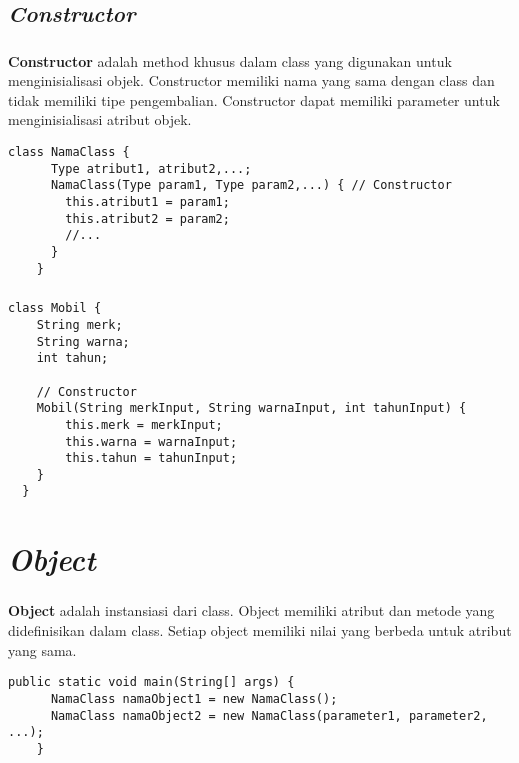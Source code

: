 \documentclass{../praktikum-ppt}
\begin{document}
  \subsection{\textit{Constructor}}
  \begin{frame}[fragile]
    \frametitle{\insertsection}
    \framesubtitle{\insertsubsection}
    \begin{definisi}
      \textbf{Constructor} adalah method khusus dalam class yang digunakan untuk menginisialisasi objek. Constructor memiliki nama yang sama dengan class dan tidak memiliki tipe pengembalian. Constructor dapat memiliki parameter untuk menginisialisasi atribut objek.
    \end{definisi}
    \begin{lstlisting}[caption={Struktur Constructor pada Class}]
    class NamaClass {
      Type atribut1, atribut2,...;
      NamaClass(Type param1, Type param2,...) { // Constructor
        this.atribut1 = param1;
        this.atribut2 = param2; 
        //...
      }
    }
    \end{lstlisting}
  \end{frame}

  \begin{frame}[fragile]
    \frametitle{\insertsection}
    \framesubtitle{\insertsubsection}
    \begin{lstlisting}[caption={Constructor pada Class Mobil}]
  class Mobil {
    String merk;
    String warna;
    int tahun;

    // Constructor
    Mobil(String merkInput, String warnaInput, int tahunInput) {
        this.merk = merkInput;
        this.warna = warnaInput;
        this.tahun = tahunInput;
    }
  }
    \end{lstlisting}
  \end{frame}

  \section{\textit{Object}}
  \begin{frame}[fragile]
    \frametitle{\insertsection}
    \begin{definisi}
      \textbf{Object} adalah instansiasi dari class. Object memiliki atribut dan metode yang didefinisikan dalam class. Setiap object memiliki nilai yang berbeda untuk atribut yang sama.
    \end{definisi}
    \begin{lstlisting}[caption={Contoh Instansiasi Object}]
    public static void main(String[] args) {
      NamaClass namaObject1 = new NamaClass();
      NamaClass namaObject2 = new NamaClass(parameter1, parameter2, ...);
    }
    \end{lstlisting}
  \end{frame}
\end{document}
